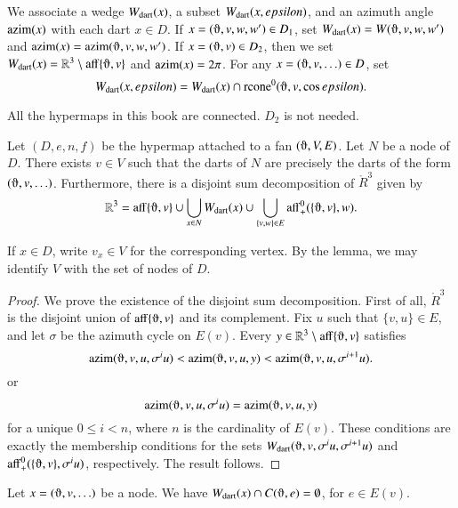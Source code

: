 We associate a wedge $W_{\text{dart}}(x)$, a subset $W_{\text{dart}}(x,epsilon)$,
and an azimuth angle ${\operatorname{azim}}(x)$
with each dart $x\in D$.  If
$x=(\orgn,v,w,w')\in D_1$, set
$\Wdart(x) = W(\orgn,v,w,w')$ and $\op{azim}(x) =
\op{azim}(\orgn,v,w,w')$.   If $x=(\orgn,v)\in D_2$, then we set
$\Wdart(x) = \ring{R}^3\setminus \op{aff}\{\orgn,v\}$ and ${\operatorname{azim}}(x) = 2\pi$.  For any $x = (\orgn,v,\ldots)\in D$, set
    $$
    \Wdart(x,\epsilon) = \Wdart(x) \cap \op{rcone}^0(\orgn,v,\cos\epsilon).
    $$

\begin{note}%
All the hypermaps in this book are connected. $D_2$ is not needed.
\end{note}


\begin{lemma}
Let $(D,e,n,f)$ be the hypermap attached to a 
fan $(\orgn,V,E)$.
Let $N$ be a node of $D$.  There exists $v\in V$
such that the darts of $N$ are precisely
the darts of the form $(\orgn,v,\ldots)$.  Furthermore, there is a 
disjoint sum decomposition of $\ring{R}^3$ given by
  $$
  \ring{R}^3 = 
  \op{aff}\{\orgn,v\} \cup
  \bigcup_{x\in N} \Wdart(x)  \cup 
  \bigcup_{\{v,w\}\in E} \op{aff}_+^0(\{\orgn,v\},w).
  $$
\end{lemma}

If $x\in D$, write $v_x\in V$ for the corresponding vertex.  By the lemma,
we may identify $V$ with the set of nodes of $D$.

\begin{proof}
We prove the existence of the disjoint sum decomposition.
First of all, $\ring{R}^3$ is the disjoint union of $\op{aff}\{\orgn,v\}$
and its complement.
Fix $u$ such that $\{v,u\}\in E$, and let $\sigma$ be the azimuth
cycle on $E(v)$.  Every $y\in\ring{R}^3\setminus\op{aff}\{\orgn,v\}$ satisfies
$$
\op{azim}(\orgn,v,u,\sigma^i u)<
\op{azim}(\orgn,v,u,y) < \op{azim}(\orgn,v,u,\sigma^{i+1} u).
$$
or 
$$
\op{azim}(\orgn,v,u,\sigma^i u) = \op{azim}(\orgn,v,u,y)
$$
for a unique $0 \le i < n$, where $n$ is the cardinality of $E(v)$.
These conditions are exactly the membership conditions for the sets
$
\Wdart(\orgn,v,\sigma^i u,\sigma^{i+1}u)
$
and $\op{aff}_+^0(\{\orgn,v\},\sigma^iu)$, respectively.
The result follows.
\end{proof}

\begin{corollary}
Let $x = (\orgn,v,\ldots)$ be a node.
We have $\Wdart(x)\cap C(\orgn,e)=\emptyset$, for $e\in E(v)$.
\end{corollary}


